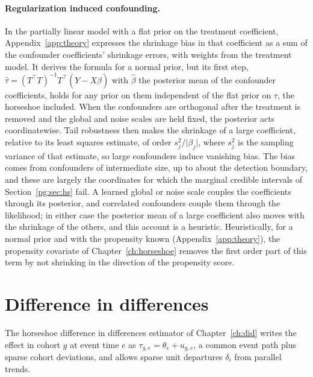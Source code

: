 \paragraph{Regularization induced confounding.} In the partially linear model with a flat prior on the treatment coefficient, Appendix~\ref{app:theory} expresses the shrinkage bias in that coefficient as a sum of the confounder coefficients' shrinkage errors, with weights from the treatment model. It derives the formula for a normal prior, but its first step, $\hat\tau = (T^\top T)^{-1}T^\top(Y - X\hat\beta)$ with $\hat\beta$ the posterior mean of the confounder coefficients, holds for any prior on them independent of the flat prior on $\tau$, the horseshoe included. When the confounders are orthogonal after the treatment is removed and the global and noise scales are held fixed, the posterior acts coordinatewise. Tail robustness then makes the shrinkage of a large coefficient, relative to its least squares estimate, of order $s_j^2/\lvert\beta_j\rvert$, where $s_j^2$ is the sampling variance of that estimate, so large confounders induce vanishing bias. The bias comes from confounders of intermediate size, up to about the detection boundary, and these are largely the coordinates for which the marginal credible intervals of Section~\ref{pg:sec:hs} fail. A learned global or noise scale couples the coefficients through its posterior, and correlated confounders couple them through the likelihood; in either case the posterior mean of a large coefficient also moves with the shrinkage of the others, and this account is a heuristic. Heuristically, for a normal prior and with the propensity known (Appendix~\ref{app:theory}), the propensity covariate of Chapter~\ref{ch:horseshoe} removes the first order part of this term by not shrinking in the direction of the propensity score.

\section{Difference in differences}\label{pg:sec:did}

The horseshoe difference in differences estimator of Chapter~\ref{ch:did} writes the effect in cohort $g$ at event time $e$ as $\tau_{g,e} = \theta_e + u_{g,e}$, a common event path plus sparse cohort deviations, and allows sparse unit departures $\delta_i$ from parallel trends.

